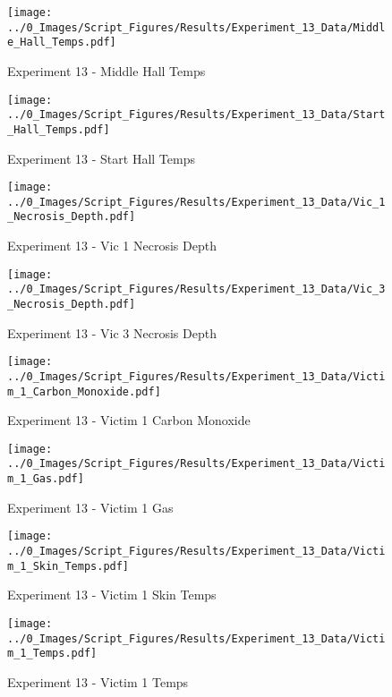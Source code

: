 	\clearpage

	\begin{figure}[H]
		\centering
		\texttt{[image: ../0\_Images/Script\_Figures/Results/Experiment\_13\_Data/Middle\_Hall\_Temps.pdf]}
		\caption[]{Experiment 13 - Middle Hall Temps}
	\end{figure}
 

	\begin{figure}[H]
		\centering
		\texttt{[image: ../0\_Images/Script\_Figures/Results/Experiment\_13\_Data/Start\_Hall\_Temps.pdf]}
		\caption[]{Experiment 13 - Start Hall Temps}
	\end{figure}
 
	\clearpage

	\begin{figure}[H]
		\centering
		\texttt{[image: ../0\_Images/Script\_Figures/Results/Experiment\_13\_Data/Vic\_1\_Necrosis\_Depth.pdf]}
		\caption[]{Experiment 13 - Vic 1 Necrosis Depth}
	\end{figure}
 

	\begin{figure}[H]
		\centering
		\texttt{[image: ../0\_Images/Script\_Figures/Results/Experiment\_13\_Data/Vic\_3\_Necrosis\_Depth.pdf]}
		\caption[]{Experiment 13 - Vic 3 Necrosis Depth}
	\end{figure}
 
	\clearpage

	\begin{figure}[H]
		\centering
		\texttt{[image: ../0\_Images/Script\_Figures/Results/Experiment\_13\_Data/Victim\_1\_Carbon\_Monoxide.pdf]}
		\caption[]{Experiment 13 - Victim 1 Carbon Monoxide}
	\end{figure}
 

	\begin{figure}[H]
		\centering
		\texttt{[image: ../0\_Images/Script\_Figures/Results/Experiment\_13\_Data/Victim\_1\_Gas.pdf]}
		\caption[]{Experiment 13 - Victim 1 Gas}
	\end{figure}
 
	\clearpage

	\begin{figure}[H]
		\centering
		\texttt{[image: ../0\_Images/Script\_Figures/Results/Experiment\_13\_Data/Victim\_1\_Skin\_Temps.pdf]}
		\caption[]{Experiment 13 - Victim 1 Skin Temps}
	\end{figure}
 

	\begin{figure}[H]
		\centering
		\texttt{[image: ../0\_Images/Script\_Figures/Results/Experiment\_13\_Data/Victim\_1\_Temps.pdf]}
		\caption[]{Experiment 13 - Victim 1 Temps}
	\end{figure}
 
